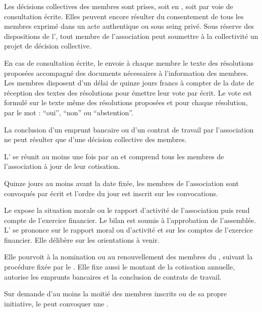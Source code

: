 \label{sec:decisions-collectives}

Les décisions collectives des membres sont prises, soit en \AG{}, soit
par voie de consultation écrite. Elles peuvent encore résulter du
consentement de tous les membres exprimé dans un acte authentique ou
sous seing privé. Sous réserve des dispositions de l',
tout membre de l'association peut soumettre à la collectivité un
projet de décision collective.

En cas de consultation écrite, le \bureau{} envoie à chaque membre le
texte des résolutions proposées accompagné des documents nécessaires à
l'information des membres. Les membres disposent d'un délai de quinze
jours francs à compter de la date de réception des textes des
résolutions pour émettre leur vote par écrit. Le vote est formulé sur
le texte même des résolutions proposées et pour chaque résolution, par
le mot : “oui”, “non” ou “abstention”.

La conclusion d'un emprunt bancaire ou d'un contrat de travail par
l'association ne peut résulter que d'une décision collective des
membres.

\label{sec:ago}
L'\AGO{} se réunit au moins une fois par an et comprend tous les membres de l'association à jour de leur cotisation.

Quinze jours au moins avant la date fixée, les membres de
l'association sont convoqués par écrit et l'ordre du jour est inscrit
sur les convocations.


Le \bureau{} expose la situation morale ou le rapport d'activité de
l'association puis rend compte de l'exercice financier. Le bilan est
soumis à l'approbation de l'assemblée. 
L'\AG{} se prononce sur le rapport moral ou d'activité et sur les comptes de l'exercice financier. Elle délibère sur les orientations à venir.

Elle pourvoit à la nomination ou au renouvellement des membres du \bureau{}, suivant la procédure fixée par le \RI{}. Elle fixe aussi le montant de la cotisation annuelle, autorise les emprunts bancaires et la conclusion de contrats de travail.


\label{sec:age}

Sur demande d'au moins la moitié des membres inscrits ou de sa propre initiative, le \bureau{} peut convoquer une \AGE{}.

